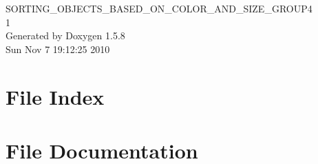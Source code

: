\documentclass[a4paper]{book}
\begin{document}
\begin{titlepage}
\vspace*{7cm}
\begin{center}
{\Large SORTING\_\-OBJECTS\_\-BASED\_\-ON\_\-COLOR\_\-AND\_\-SIZE\_\-GROUP4 \\[1ex]\large 1 }\\
\vspace*{1cm}
{\large Generated by Doxygen 1.5.8}\\
\vspace*{0.5cm}
{\small Sun Nov 7 19:12:25 2010}\\
\end{center}
\end{titlepage}
\clearemptydoublepage
{}
\tableofcontents
\clearemptydoublepage
{}
\chapter{File Index}

\chapter{File Documentation}







\printindex
\end{document}
